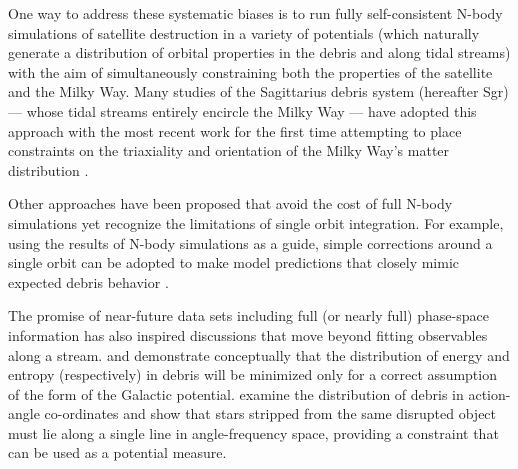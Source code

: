 \documentclass{emulateapj}
\begin{document}
One way to address these systematic biases is to run fully self-consistent N-body simulations of satellite destruction in a variety of potentials (which naturally generate a
distribution of orbital properties in the debris and along tidal streams) with the aim of simultaneously constraining both the properties of the satellite and the Milky Way.
Many studies of the Sagittarius debris system (hereafter Sgr) --- whose tidal streams entirely encircle the Milky Way --- have adopted this approach \citep[e.g.][]
{law05,fellhauer06} with the most recent work for the first time attempting to place constraints on the triaxiality and orientation of the Milky Way's matter distribution
\citep{law10}.

Other approaches have been proposed that avoid the cost of full N-body simulations yet recognize the limitations of single orbit integration.
For example, using the results of N-body simulations as a guide, simple corrections around a single orbit can be adopted to make model predictions that closely
mimic expected debris behavior \citep[e.g.][]{johnston99b,varghese11}.

The promise of near-future data sets including full (or nearly full) phase-space information has also inspired discussions that move beyond fitting observables along a
stream.
\citet{binney08} and \citet{penarrubia12} demonstrate conceptually that the distribution of energy and entropy (respectively) in debris will be minimized only for a correct
assumption of the form of the Galactic potential.
\citet{sanders13b} examine the distribution of debris in action-angle co-ordinates and show that stars stripped from the same disrupted object must lie along a single line in angle-frequency space, providing a constraint that can be used as a potential measure.
\end{document}
